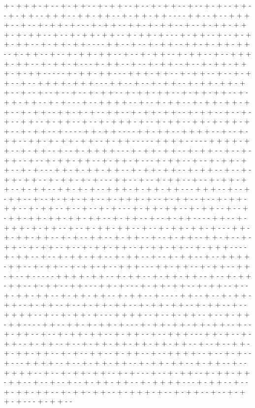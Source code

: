 + - + + + - + - - + - + + - - + - + + - - + - - + - + + - - + - - + - + - - + + - - + - + + - - + + + - - + + - + + - - + - + + - + + - - - - + + - - + - - + + + + - - + - - + - + + - + - - - + - + + - - + + - + - + + - - + - - + - + + - + + + - + - + + - - + - - + - + + - + + - - + - + + - + - - - + - + + - - + - - + - + + - + + - - + - + + - + + - - - - + + - - + - - + - + + - - + + - + - + + - + + - - + - + + - - + - - + - + + - + + - - + - - + - + + - - + - + + - - + - - + + + + - + + - - + - + + - + - - - + - + + - - + - - + - + + - - + - - + - + + - + + + - + - + + - - - - - + - + + - + + - - - + + + - + + - - + - + + - - + - - + - + + - - + - - + + + + - + + + - - - + + - - + - - + - + + - - + - + + - + + - + + - - + - - + - - + - - + - - + - + + - - + - + + - + + - - + - + + - + + - - + - + + - + + - - + - + - - - + - - + + + + - - + - - + - + + - - + - + + - + + - + + - - + - + + - - + + - + - + - - + + - - + - + + - + + - - + - + + - - + - - + - + - - + + - - + - + + - - + - - + - + + + - + - - + - + + - - + + - + - + + - + + - - + - + + - - + - - - - + + - + + - - - - + + - + + - - + + + + - - + - - + - + + - - + + - + - + + - + + - - + - + + - - - - - + + + + - - - - - + + + + - + + - - + - + + - - + - - + - + + + + - - - + - + + - + + - - + - + + - - + - - + - + + - - + - - + - + + - + + - - + - + + - + - - - + - + + - - + - - + - + + - + + - - + - + - - - + + - + - + + - + + - - + - + + - + + - - + - + + - - + - - + - + + - + + - - + - + + - + - + - - - + + - - + - - + - + + - - + - - + - + + - + + - - + - + + - - + + - + - + - - + + + - + - + + - + + - - - + + + - - + - - + - + + - - + - - + - + + - + + - - + - + + + - + - - + - + + - - + - - + - + + - + + - - + - + + - - + - - + - - + - + - - - + - + + - + + - - + - + + - - + - - + - + + - + + - + + - + + - + + - - + - + + - - + - - + - + + - - - - + + - - + - + + + - + - + + - - + - - + - + + - + + - - + - - + - + + - + + - + - - - + + - + - + + - + + - - + - + - - + + - - + - + + - - + - - + - + + - - + + - + - - + - + + - - + - + + - - + - - + - + + - + + - - + - + + - + + - - + - + + + - - - - + - + + - - + - - + - + + - + + - - + - + + - - + - - + - + + - - + - - + + + + - + + - - + - + + - - + - + + - + - - + + + - - - + + - + + - - + - + + - - + + - + - - + - - - - - + + + + - + + - - + - + + - - + - + + - + + - - + - - + - + + - + + - - + - + + - - + + - - - + + - + - - - + - + + - + + - - + - + + - - + - - + - + + - + + - - + - + + - + + - - + - + + - - + - - - - + + - - + - - + - + + - + + - - + - + + - - + - - + - + + - + + - - + - + + - + + - - + - + + - - + - - + + + + - - + - - + - + + - + - - - + + + + - - + - - + - + + - - + - - + - + + - + + - - - - + + - - + + - + - + + - + - - - + - + + - + + - + + - + + - - + - - + - + + - - + - - + - + + - + + - - + - + + - - + - - + + + - - - + + - + - - + - + + - - + - + + - - + - - + - + + - + + - + + - + + - + + - - + - - + - - + + - + - + + - + + - - + - + - - + + - - + - + + - - + - - + + + + - - + - - + - + - - + - - - + + + + - - + - - + - + + - + + - - + - + + - + + - - + - + + - - + - - + + + + - - + - - + - + + - + + - - + - + - - - + - - + - + + - - + - + + - + + - + + - - + - - + - - + - - + - + + - + + - - + - + + + + - - - + - + + - - + - - + - + + - + + - - + - + + - + + - - + - + + + - + - - + - + + - - + - - + - + + - + - - - + - + + - - 